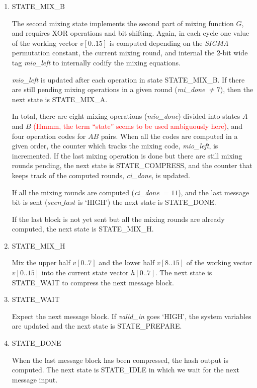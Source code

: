 \documentclass[%
	a4paper,
]
{article}
\newcommand{\todo}[1]{\textcolor{red}{#1}}
\begin{document}
\begin{enumerate}
	\item STATE_MIX_B

		The second mixing state implements the second part of mixing function $G$,
		and requires XOR operations and bit shifting. Again, in each cycle
		one value of the working vector $v[0..15]$ is computed depending on the
		\emph{SIGMA} permutation constant, the current mixing round, and internal
		the 2-bit wide tag \emph{mio\_left} to internally codify the mixing equations.

		\emph{mio\_left} is updated after each operation in state
		\mbox{STATE_MIX_B}.	If there are still pending mixing operations in a given
		round	(\emph{mi_done} $\neq 7$), then the next state is \mbox{STATE_MIX_A}.

		In total, there are eight mixing operations (\emph{mio_done}) divided into
		states $A$ and $B$ \todo{(Hmmm, the term ``state'' seems to be used
		ambiguously here)}, and four operation codes for $AB$
		pairs. When all the	codes are computed in a given order, the counter which
		tracks the mixing code, \emph{mio\_left}, is incremented. If the last
		mixing operation is done but there are still mixing rounds pending, the next
		state is \mbox{STATE_COMPRESS}, and the counter that keeps track of the
		computed rounds, \emph{ci_done}, is updated.

		If all the mixing rounds are computed (\emph{ci_done} $= 11$), and the
		last message bit is sent ($seen\_last$ is `HIGH') the next state is
		\mbox{STATE_DONE}.

		If the last block is not yet sent but all the mixing
		rounds are already computed, the next state is \mbox{STATE_MIX_H}.

	\item STATE_MIX_H

		Mix the upper half $v[0..7]$ and the lower half $v[8..15]$ of the working
		vector $v[0..15]$ into the current state vector $h[0..7]$. The next state
		is \mbox{STATE_WAIT} to compress the next message block.

	\item STATE_WAIT

		Expect the next message block. If \emph{valid_in} goes `HIGH', the system
		variables are updated and the next state is \mbox{STATE_PREPARE}.

	\item STATE_DONE

		When the last message block has been compressed, the hash output is computed.
		The next state is \mbox{STATE_IDLE} in which we wait for the next message
		input.

\end{enumerate}		
\end{document}

